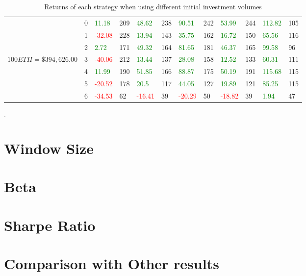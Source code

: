 \begin{table}[htb!]
\begin{adjustwidth}{-0.9in}{-0.9in}
\begin{tabular}{|p{5em}|p{2em}|p{3em}|p{3em}|p{3em}|p{3em}|p{3em}|p{3em}|p{3em}|p{3em}|p{3em}|p{3em}|}
            & 0 & \textcolor{green}{11.18} & 209 & \textcolor{green}{48.62} & 238 & \textcolor{green}{90.51} & 242 & \textcolor{green}{53.99} & 244 & \textcolor{green}{112.82} & 105\\\cline{3-12}
            & 1 & \textcolor{red}{-32.08} & 228 & \textcolor{green}{13.94} & 143 & \textcolor{green}{35.75} & 162 & \textcolor{green}{16.72} & 150 & \textcolor{green}{65.56} & 116\\\cline{3-12}
            & 2 & \textcolor{green}{2.72} & 171 & \textcolor{green}{49.32} & 164 & \textcolor{green}{81.65} & 181 & \textcolor{green}{46.37} & 165 & \textcolor{green}{99.58} & 96\\\cline{3-12}
            $100 ETH = \$394,626.00$ & 3 & \textcolor{red}{-40.06} & 212 & \textcolor{green}{13.44} & 137 & \textcolor{green}{28.08} & 158 & \textcolor{green}{12.52} & 133 & \textcolor{green}{60.31} & 111\\\cline{3-12}
            & 4 & \textcolor{green}{11.99} & 190 & \textcolor{green}{51.85} & 166 & \textcolor{green}{88.87} & 175 & \textcolor{green}{50.19} & 191 & \textcolor{green}{115.68} & 115\\\cline{3-12}
            & 5 & \textcolor{red}{-20.52} & 178 & \textcolor{green}{20.5} & 117 & \textcolor{green}{44.05} & 127 & \textcolor{green}{19.89} & 121 & \textcolor{green}{85.25} & 115\\\cline{3-12}
            & 6 & \textcolor{red}{-34.53} & 62 & \textcolor{red}{-16.41} & 39 & \textcolor{red}{-20.29} & 50 & \textcolor{red}{-18.82} & 39 & \textcolor{green}{1.94} & 47\\\hline
        \end{tabular}
    \end{adjustwidth}
    \caption{Returns of each strategy when using different initial investment volumes \label{tab:VaryInitialInvestments}}.
\end{table}

\section{Window Size}

\section{Beta}

\section{Sharpe Ratio}

\section{Comparison with Other results}
